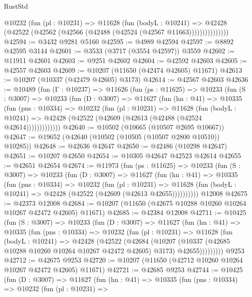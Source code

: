 \begin{lexlean}{RustStd}
\begin{coremodule}
                @10232
                  (fun (pl : @10231) =>
                  @11628
                    (fun (bodyL : @10241) =>
                    @42428 (@42522 (@42562 (@42566 (@42488 (@42524 (@42567 @11663)))))))))))))))
@42594 := @3432 @9281 @5160
@42595 := @4989 @42594
@42597 := @8892 @42595 @3144
@42601 := @3533 (@3717 (@3554 @42597)) @3559
@42602 := @11911 @42601
@42603 := @9251 @42602
@42604 := @42592 @42603
@42605 := @42557 @42603
@42609 := @10207 (@11650 (@42474 @42605) @11671)
@42613 := @10207 (@10337 (@42479 @42605) @3173)
@42614 := @42567 @42603
@42636 := @10489
    (fun (Γ : @10237) =>
    @11626
      (fun (ps : @11625) =>
      @10233
        (fun (S : @3007) =>
        @10233
          (fun (D : @3007) =>
          @11627
            (fun (hn : @41) =>
            @10335
              (fun (pns : @10334) =>
              @10232
                (fun (pl : @10231) =>
                @11628
                  (fun (bodyL : @10241) =>
                  @42428 (@42522 (@42609 (@42613 (@42488 (@42524 @42614)))))))))))))
@42640 := @10502 (@10665 (@10507 @2695 @10667))
@42647 := @19652 (@42640 (@10502 (@10505 (@10507 @2800 @10510)) @10285))
@42648 := @42636 @42647
@42650 := @42486 (@10298 @42647)
@42651 := @10207 @42650
@42654 := @10305 @42647 @42523 @42614
@42655 := @42651 @42654
@42674 := @11973
    (fun (ps : @11625) =>
    @10233
      (fun (S : @3007) =>
      @10233
        (fun (D : @3007) =>
        @11627
          (fun (hn : @41) =>
          @10335
            (fun (pns : @10334) =>
            @10232
              (fun (pl : @10231) =>
              @11628 (fun (bodyL : @10241) => @42428 (@42522 (@42609 (@42613 @42655))))))))))
    @12008
@42675 := @42373 @12008
@42684 := @10207 (@11650 (@42675 @10288 @10260 @10264 @10267 @42472 @42605) @11671)
@42685 := @42384 @12008
@42711 := @10425
    (fun (S : @3007) =>
    @10233
      (fun (D : @3007) =>
      @11627
        (fun (hn : @41) =>
        @10335
          (fun (pns : @10334) =>
          @10232
            (fun (pl : @10231) =>
            @11628
              (fun (bodyL : @10241) =>
              @42428
                (@42522
                  (@42684
                    (@10207
                      (@10337 (@42685 @10288 @10260 @10264 @10267 @42472 @42605) @3173)
                      @42655)))))))))
    @9253
@42712 := @42675 @9253
@42720 := @10207 (@11650 (@42712 @10260 @10264 @10267 @42472 @42605) @11671)
@42721 := @42685 @9253
@42744 := @10425
    (fun (D : @3007) =>
    @11627
      (fun (hn : @41) =>
      @10335
        (fun (pns : @10334) =>
        @10232
          (fun (pl : @10231) =>

\end{coremodule}
\end{lexlean}
